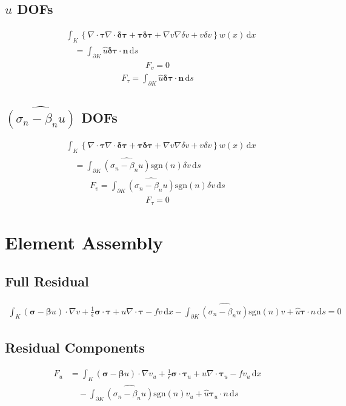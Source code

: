 \documentclass[a4paper]{article}
\def\d{\,\mathrm{d}}
\def\dx{\d x}
\def\ds{\d s}
\def\btau{\boldsymbol\tau}
\def\bsigma{\boldsymbol\sigma}
\def\bbeta{\boldsymbol\beta}
\def\bn{\mathbf{n}}
\def\dtau{\boldsymbol{\delta\tau}}
\def\dv{\delta v}
\def\div{\nabla\cdot}
\begin{document}
\subsection*{$\hat u$ DOFs}
\begin{align*}
&\int_K\left\{\div\btau\div\dtau+\btau\dtau
+\nabla v\nabla\dv+v\dv\right\}w(x)\dx\\
&\quad=\int_{\partial K}\hat u\dtau\cdot\bn\ds
\end{align*}
\begin{align*}
F_v=0
\end{align*}
\begin{align*}
F_\tau=
\int_{\partial K}\hat u\dtau\cdot\bn
\ds
\end{align*}
\subsection*{$\widehat{(\sigma_n-\beta_nu)}$ DOFs}
\begin{align*}
&\int_K\left\{\div\btau\div\dtau+\btau\dtau
+\nabla v\nabla\dv+v\dv\right\}w(x)\dx\\
&\quad=\int_{\partial K}\widehat{(\sigma_n-\beta_nu)}\text{sgn}(n)\dv\ds
\end{align*}
\begin{align*}
F_v=
\int_{\partial K}\widehat{(\sigma_n-\beta_nu)}\text{sgn}(n)\dv\ds
\end{align*}
\begin{align*}
F_\tau=
0
\end{align*}
\section*{Element Assembly}
\subsection*{Full Residual}
\begin{align*}
\int_K
(\bsigma-\bbeta u)\cdot\nabla v
+\frac{1}{\epsilon}\bsigma\cdot\btau+u\nabla\cdot\btau
-fv\dx
-\int_{\partial K}
\widehat{(\sigma_n-\beta_nu)}\text{sgn}(n)v
+\hat u\btau\cdot n\ds=0
\end{align*}
\subsection*{Residual Components}
\begin{align*}
F_u&=\int_K
(\bsigma-\bbeta u)\cdot\nabla v_u
+\frac{1}{\epsilon}\bsigma\cdot\btau_u+u\nabla\cdot\btau_u
-fv_u\dx\\
&\quad-\int_{\partial K}
\widehat{(\sigma_n-\beta_nu)}\text{sgn}(n)v_u
+\hat u\btau_u\cdot n\ds
\end{align*}
\end{document}
